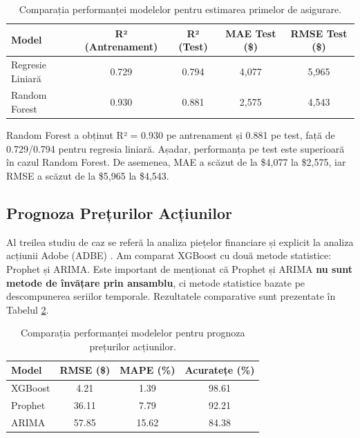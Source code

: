 \documentclass[a4paper,12pt]{article}
\begin{document}
\begin{table}[H]
\centering
\begin{tabular}{lcccc}
\toprule
\textbf{Model} & \textbf{R² (Antrenament)} & \textbf{R² (Test)} & \textbf{MAE Test (\$)} & \textbf{RMSE Test (\$)} \\
\midrule
Regresie Liniară & 0.729 & 0.794 & 4,077 & 5,965 \\
Random Forest & 0.930 & 0.881 & 2,575 & 4,543 \\
\bottomrule
\end{tabular}
\caption{Comparația performanței modelelor pentru estimarea primelor de asigurare.}
\label{tab:insurance_results}
\end{table}

Random Forest a obținut R² = 0.930 pe antrenament și 0.881 pe test, față de 0.729/0.794 pentru regresia liniară. Așadar, performanța pe test este superioară în cazul Random Forest. De asemenea, MAE a scăzut de la \$4,077 la \$2,575, iar RMSE a scăzut de la \$5,965 la \$4,543.

\subsection{Prognoza Prețurilor Acțiunilor}
\label{sec:stock}

Al treilea studiu de caz se referă la analiza piețelor financiare și explicit la analiza acțiunii Adobe (ADBE) \cite{stock_dataset}. Am comparat XGBoost \cite{chen2016xgboost} cu două metode statistice: Prophet și ARIMA. Este important de menționat că Prophet și ARIMA \textbf{nu sunt metode de învățare prin ansamblu}, ci metode statistice bazate pe descompunerea seriilor temporale. Rezultatele comparative sunt prezentate în Tabelul \ref{tab:stock_results}.

\begin{table}[H]
\centering
\begin{tabular}{lccc}
\toprule
\textbf{Model} & \textbf{RMSE (\$)} & \textbf{MAPE (\%)} & \textbf{Acuratețe (\%)} \\
\midrule
XGBoost & 4.21 & 1.39 & 98.61 \\
Prophet & 36.11 & 7.79 & 92.21 \\
ARIMA & 57.85 & 15.62 & 84.38 \\
\bottomrule
\end{tabular}
\caption{Comparația performanței modelelor pentru prognoza prețurilor acțiunilor.}
\label{tab:stock_results}
\end{table}
\end{document}
